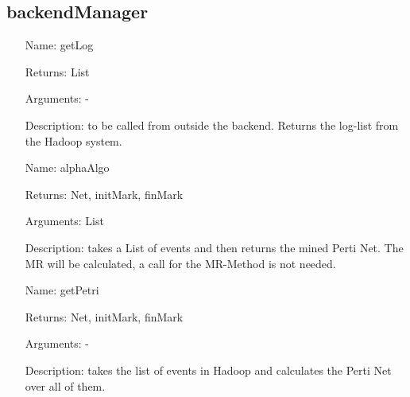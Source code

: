 \documentclass[runningheads]{llncs}
\begin{document}
\subsection{backendManager}
\begin{itemize}
\item[Name:] getLog
\item[Returns:] List
\item[Arguments:] -
\item[Description:] to be called from outside the backend. Returns the log-list from the Hadoop system.
\end{itemize}
\begin{itemize}
\item[Name:] alphaAlgo
\item[Returns:] Net, initMark, finMark
\item[Arguments:] List
\item[Description:] takes a List of events and then returns the mined Perti Net. The MR will be calculated, a call for the MR-Method is not needed.
\end{itemize}

\begin{itemize}
\item[Name:] getPetri
\item[Returns:] Net, initMark, finMark
\item[Arguments:] -
\item[Description:] takes the list of events in Hadoop and calculates the Perti Net over all of them.
\end{itemize}



\end{document}
